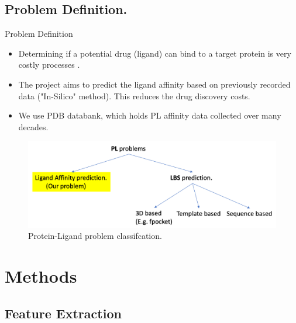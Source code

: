 \documentclass{beamer}
\begin{document}
\subsection{Problem Definition.}

\begin{frame}[t]{Problem Definition}

\begin{itemize}
\item Determining if a potential drug (ligand) can bind to a target protein is very costly processes \cite{drugdiscoverycost}.
\item The project aims to predict the ligand affinity based on previously recorded data ("In-Silico" method).  This reduces the drug discovery costs.
\item We use PDB databank,  which holds PL affinity data collected over many decades.
\end{itemize}

\begin{figure}[htb]
  \centering
    \includegraphics[scale=0.25]{images/pl_problem_classification}
    \caption{Protein-Ligand problem classifcation.}
    \label{fig:plproblemclassification}
\end{figure}


\end{frame}

\section{Methods}
\subsection{Feature Extraction}
\end{document}
